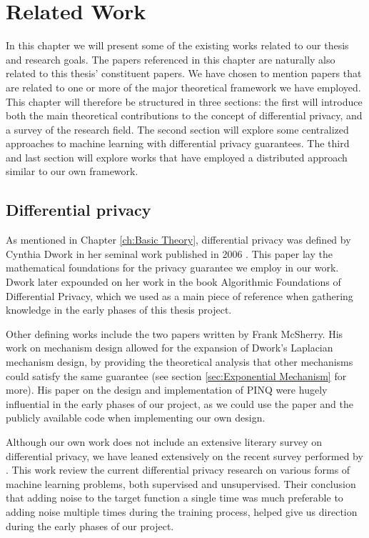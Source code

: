 
\chapter{Related Work} \label{ch:Related Work}

In this chapter we will present some of the existing works related to our thesis and research goals. The papers referenced in this chapter are naturally also related to this thesis' constituent papers. We have chosen to mention papers that are related to one or more of the major theoretical framework we have employed. This chapter will therefore be structured in three sections: the first will introduce both the main theoretical contributions to the concept of differential privacy, and a survey of the research field. The second section will explore some centralized approaches to machine learning with differential privacy guarantees. The third and last section will explore works that have employed a distributed approach similar to our own framework.   

\section{Differential privacy}
As mentioned in Chapter \ref{ch:Basic Theory}, differential privacy was defined by Cynthia Dwork in her seminal work published in 2006 \citep{Dwork06differentialprivacy}. This paper lay the mathematical foundations for the privacy guarantee we employ in our work. Dwork later expounded on her work in the book Algorithmic Foundations of Differential Privacy\citep{dwork2013algorithmic}, which we used as a main piece of reference when gathering knowledge in the early phases of this thesis project.

Other defining works include the two papers written by Frank McSherry. His work on mechanism design \citep{mcsherry2007} allowed for the expansion of Dwork's Laplacian mechanism design, by providing the theoretical analysis that other mechanisms could satisfy the same guarantee (see section \ref{sec:Exponential Mechanism} for more). His paper \citep{mcsherry2009PINQ} on the design and implementation of PINQ were hugely influential in the early phases of our project, as we could use the paper and the publicly available code when implementing our own design. 

Although our own work does not include an extensive literary survey on differential privacy, we have leaned extensively on the recent survey performed by \cite{ji2014differential}. This work review the current differential privacy research on various forms of machine learning problems, both supervised and unsupervised. Their conclusion that adding noise to the target function a single time was much preferable to adding noise multiple times during the training process, helped give us direction during the early phases of our project.  

